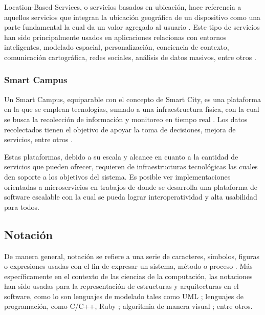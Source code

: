Location-Based Services, o servicios basados en ubicación, hace referencia a aquellos servicios que integran la ubicación geográfica de un dispositivo como una parte fundamental la cual da un valor agregado al usuario \cite{Schiller2004}. Este tipo de servicios han sido principalmente usados en aplicaciones relacionas con entornos inteligentes, modelado espacial, personalización, conciencia de contexto, comunicación cartográfica, redes sociales, análisis de datos masivos, entre otros \cite{Gartner2015,alliedmarketresearch2023}. 

\subsubsection{Smart Campus}


Un Smart Campus, equiparable con el concepto de Smart City, es una plataforma en la que se emplean tecnologías, sumado a una infraestructura física, con la cual se busca la recolección de información y monitoreo en tiempo real \cite{MinAllah2020}. Los datos recolectados tienen el objetivo de apoyar la toma de decisiones, mejora de servicios, entre otros \cite{Anagnostopoulos_2023}.

Estas plataformas, debido a su escala y alcance en cuanto a la cantidad de servicios que pueden ofrecer, requieren de 
infraestructuras tecnológicas las cuales den soporte a los objetivos del sistema. Es posible ver implementaciones orientadas a microservicios en trabajos de \citeauthor{henry_2020} \citeyear{henry_2020} donde se desarrolla una plataforma de software escalable con la cual se pueda lograr interoperatividad y alta usabilidad para todos.


\subsection{Notación}

De manera general, notación se refiere a una serie de caracteres, símbolos, figuras o expresiones usadas con el fin de expresar un sistema, método o proceso \cite{MerriamWebsterNotation}. Más específicamente en el contexto de las ciencias de la computación, las notaciones han sido usadas para la representación de estructuras y arquitecturas en el software, como lo son lenguajes de modelado tales como UML \cite{WhatIsUML}; lenguajes de programación, como C/C++, Ruby \cite{Bansal2013}; algoritmia de manera visual \cite{RutanenKalle2018McoO}; entre otros.


